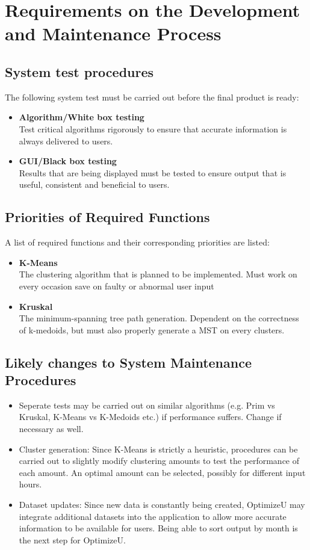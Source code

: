 \documentclass[12pt]{article}
\begin{document}
\section{Requirements on the Development and Maintenance Process}
\subsection{System test procedures}
The following system test must be carried out before the final product is ready:
\begin{itemize}
	\item \textbf{Algorithm/White box testing}\\
		Test critical algorithms rigorously to ensure that accurate information
		is always delivered to users.
	\item \textbf{GUI/Black box testing}\\
		Results that are being displayed must be tested to ensure output that is useful,
		consistent and beneficial to users.
\end{itemize}
\subsection{Priorities of Required Functions}
A list of required functions and their corresponding priorities are listed:
\begin{itemize}
	\item \textbf{K-Means}\\
		The clustering algorithm that is planned to be implemented. Must work on
		every occasion save on faulty or abnormal user input
	\item \textbf{Kruskal}\\
		The minimum-spanning tree path generation. Dependent on the correctness
		of k-medoids, but must also properly generate a MST on every clusters.
\end{itemize}
\subsection{Likely changes to System Maintenance Procedures}
\begin{itemize}
	\item Seperate tests may be carried out on similar algorithms (e.g. Prim vs Kruskal,
	K-Means vs K-Medoids etc.) if performance suffers. Change if necessary as well.
	\item Cluster generation: Since K-Means is strictly a heuristic, procedures can be 
	carried out to slightly modify clustering amounts to test the performance of each
	amount. An optimal amount can be selected, possibly for different input hours.
	\item Dataset updates: Since new data is constantly being created, OptimizeU may
	integrate additional datasets into the application to allow more accurate information
	to be available for users. Being able to sort output by month is the next step
	for OptimizeU.
\end{itemize}
\end{document}
